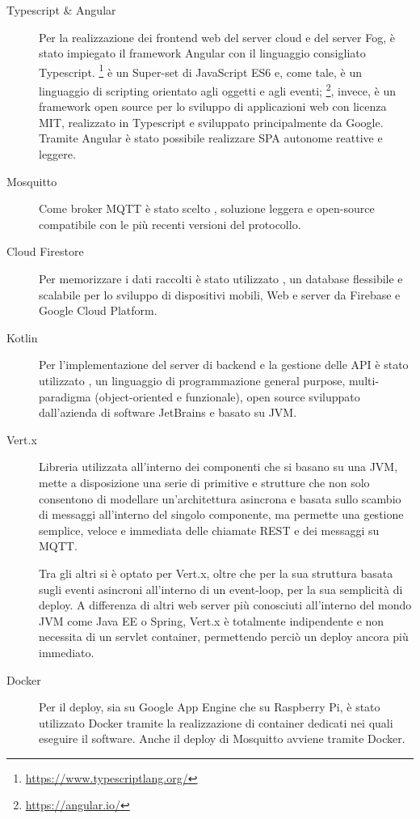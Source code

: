 \begin{description}
  \item[Typescript \& Angular]
    Per la realizzazione dei frontend web del server cloud e del server Fog, è stato impiegato il framework Angular con il linguaggio consigliato Typescript.
    \footnote{\url{https://www.typescriptlang.org/}} è un Super-set di JavaScript ES6 e, come tale, è un linguaggio di scripting orientato agli oggetti e agli eventi;
    \footnote{\url{https://angular.io/}}, invece, è un framework open source per lo sviluppo di applicazioni web con licenza MIT, realizzato in Typescript e sviluppato principalmente da Google.
    Tramite Angular è stato possibile realizzare SPA autonome reattive e leggere.
  \item[Mosquitto\footnotemark]
    Come broker MQTT è stato scelto , soluzione leggera e open-source compatibile con le più recenti versioni del protocollo.
  \item[Cloud Firestore]
    Per memorizzare i dati raccolti è stato utilizzato , un database flessibile e scalabile per lo sviluppo di dispositivi mobili, Web e server da Firebase e Google Cloud Platform.
  \item[Kotlin\footnotemark]
    Per l'implementazione del server di backend e la gestione delle API è stato utilizzato , un linguaggio di programmazione general purpose, multi-paradigma (object-oriented e funzionale), open source sviluppato dall'azienda di software JetBrains e basato su JVM\@.
  \item[Vert.x\footnotemark]
    Libreria utilizzata all’interno dei componenti che si basano su una JVM, mette a disposizione una serie di primitive e strutture che non solo consentono di modellare un'architettura asincrona e basata sullo scambio di messaggi all'interno del singolo componente, ma permette una gestione semplice, veloce e immediata delle chiamate REST e dei messaggi su MQTT\@.

    Tra gli altri si è optato per Vert.x, oltre che per la sua struttura basata sugli eventi asincroni all’interno di un event-loop, per la sua semplicità di deploy.
    A differenza di altri web server più conosciuti all’interno del mondo JVM come Java EE o Spring, Vert.x è totalmente indipendente e non necessita di un servlet container, permettendo perciò un deploy ancora più immediato.
  \item[Docker]
    Per il deploy, sia su Google App Engine che su Raspberry Pi, è stato utilizzato Docker tramite la realizzazione di container dedicati nei quali eseguire il software.
    Anche il deploy di Mosquitto avviene tramite Docker.
\end{description}

